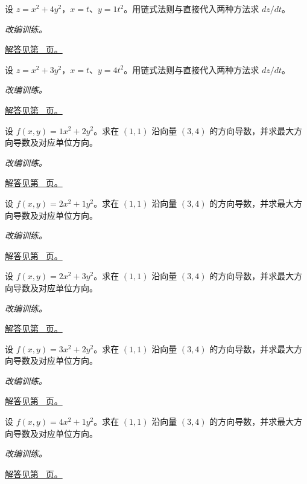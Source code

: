 \documentclass[12pt,fontset=fandol]{ctexart}
\begin{document}
\begin{example}[复合函数的两种求导路径]\label{ex:c34q6}
设 $z=x^2+4y^2$，$x=t$、$y=1t^2$。用链式法则与直接代入两种方法求 $dz/dt$。
\par\textit{改编训练。}\par\hyperref[ans:c34q6]{解答见第~\pageref{ans:c34q6} 页。}
\end{example}
\begin{example}[复合函数的两种求导路径]\label{ex:c34q7}
设 $z=x^2+3y^2$，$x=t$、$y=4t^2$。用链式法则与直接代入两种方法求 $dz/dt$。
\par\textit{改编训练。}\par\hyperref[ans:c34q7]{解答见第~\pageref{ans:c34q7} 页。}
\end{example}
\begin{example}[梯度与最陡方向]\label{ex:c34q8}
设 $f(x,y)=1x^2+2y^2$。求在 $(1,1)$ 沿向量 $(3,4)$ 的方向导数，并求最大方向导数及对应单位方向。
\par\textit{改编训练。}\par\hyperref[ans:c34q8]{解答见第~\pageref{ans:c34q8} 页。}
\end{example}
\begin{example}[梯度与最陡方向]\label{ex:c34q9}
设 $f(x,y)=2x^2+1y^2$。求在 $(1,1)$ 沿向量 $(3,4)$ 的方向导数，并求最大方向导数及对应单位方向。
\par\textit{改编训练。}\par\hyperref[ans:c34q9]{解答见第~\pageref{ans:c34q9} 页。}
\end{example}
\begin{example}[梯度与最陡方向]\label{ex:c34q10}
设 $f(x,y)=2x^2+3y^2$。求在 $(1,1)$ 沿向量 $(3,4)$ 的方向导数，并求最大方向导数及对应单位方向。
\par\textit{改编训练。}\par\hyperref[ans:c34q10]{解答见第~\pageref{ans:c34q10} 页。}
\end{example}
\begin{example}[梯度与最陡方向]\label{ex:c34q11}
设 $f(x,y)=3x^2+2y^2$。求在 $(1,1)$ 沿向量 $(3,4)$ 的方向导数，并求最大方向导数及对应单位方向。
\par\textit{改编训练。}\par\hyperref[ans:c34q11]{解答见第~\pageref{ans:c34q11} 页。}
\end{example}
\begin{example}[梯度与最陡方向]\label{ex:c34q12}
设 $f(x,y)=4x^2+1y^2$。求在 $(1,1)$ 沿向量 $(3,4)$ 的方向导数，并求最大方向导数及对应单位方向。
\par\textit{改编训练。}\par\hyperref[ans:c34q12]{解答见第~\pageref{ans:c34q12} 页。}
\end{example}
\end{document}
